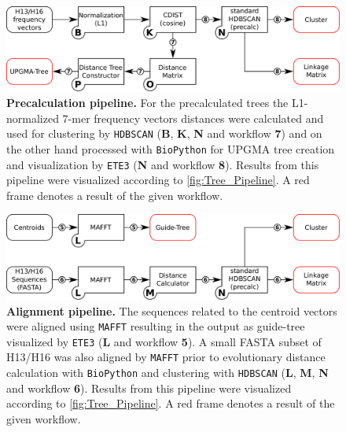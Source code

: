 \begin{figure}[!hbt]
    \centering
    \includegraphics[width=\textwidth]{Graphics/Precalculated.pdf}
    \caption[Precalculation pipeline]{\textbf{Precalculation pipeline.} For the precalculated trees the L1-normalized 7-mer frequency vectors distances were calculated and used for clustering by \texttt{HDBSCAN} (\textsf{\textbf{B}}, \textsf{\textbf{K}}, \textsf{\textbf{N}} and workflow \textsf{\textbf{7}}) and on the other hand processed with \texttt{BioPython} for \gls{UPGMA} tree creation and visualization by \texttt{ETE3} (\textsf{\textbf{N}} and workflow \textsf{\textbf{8}}). Results from this pipeline were visualized according to \autoref{fig:Tree_Pipeline}. A red frame denotes a result of the given workflow.}
    \label{fig:Precalc_Pipeline}
\end{figure}

\begin{figure}[!hbt]
    \centering
    \includegraphics[width=\textwidth]{Graphics/Alignment.pdf}
    \caption[Alignment pipeline]{\textbf{Alignment pipeline.} The sequences related to the centroid vectors were aligned using \texttt{MAFFT} resulting in the output as guide-tree visualized by \texttt{ETE3} (\textsf{\textbf{L}} and workflow \textsf{\textbf{5}}). A small FASTA subset of H13/H16 was also aligned by \texttt{MAFFT} prior to evolutionary distance calculation with \texttt{BioPython} and clustering with \texttt{HDBSCAN} (\textsf{\textbf{L}}, \textsf{\textbf{M}}, \textsf{\textbf{N}} and workflow \textsf{\textbf{6}}). Results from this pipeline were visualized according to \autoref{fig:Tree_Pipeline}. A red frame denotes a result of the given workflow.}
    \label{fig:Alignment_Pipeline}
\end{figure}

